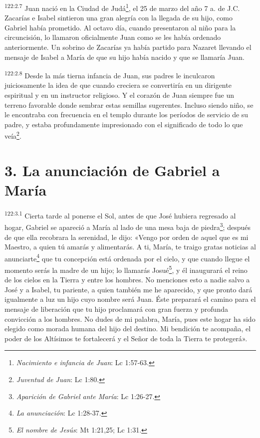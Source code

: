 \par 
\textsuperscript{122:2.7} Juan nació en la Ciudad de Judá\footnote{\textit{Nacimiento e infancia de Juan}: Lc 1:57-63.}, el 25 de marzo del año
7 a. de J.C. Zacarías e Isabel sintieron una gran alegría con la llegada de su hijo, como Gabriel había prometido. Al octavo día, cuando presentaron al niño para la circuncisión, lo llamaron oficialmente Juan como se les había ordenado anteriormente. Un sobrino de Zacarías ya había partido para Nazaret llevando el mensaje de Isabel a María de que su hijo había nacido y que se llamaría Juan.

\par 
\textsuperscript{122:2.8} Desde la más tierna infancia de Juan, sus padres le inculcaron juiciosamente la idea de que cuando creciera se convertiría en un dirigente espiritual y en un instructor religioso. Y el corazón de Juan siempre fue un terreno favorable donde sembrar estas semillas sugerentes. Incluso siendo niño, se le encontraba con frecuencia en el templo durante los períodos de servicio de su padre, y estaba profundamente impresionado con el significado de todo lo que veía\footnote{\textit{Juventud de Juan}: Lc 1:80.}.

\section*{3. La anunciación de Gabriel a María}
\par 
\textsuperscript{122:3.1} Cierta tarde al ponerse el Sol, antes de que José hubiera regresado al hogar, Gabriel se apareció a María al lado de una mesa baja de piedra\footnote{\textit{Aparición de Gabriel ante María}: Lc 1:26-27.}; después de que ella recobrara la serenidad, le dijo: «Vengo por orden de aquel que es mi Maestro, a quien tú amarás y alimentarás. A ti, María, te traigo gratas noticias al anunciarte\footnote{\textit{La anunciación}: Lc 1:28-37.} que tu concepción está ordenada por el cielo, y que cuando llegue el momento serás la madre de un hijo; lo llamarás Josué\footnote{\textit{El nombre de Jesús}: Mt 1:21,25; Lc 1:31.}, y él inaugurará el reino de los cielos en la Tierra y entre los hombres. No menciones esto a nadie salvo a José y a Isabel, tu pariente, a quien también me he aparecido, y que pronto dará igualmente a luz un hijo cuyo nombre será Juan. Éste preparará el camino para el mensaje de liberación que tu hijo proclamará con gran fuerza y profunda convicción a los hombres. No dudes de mi palabra, María, pues este hogar ha sido elegido como morada humana del hijo del destino. Mi bendición te acompaña, el poder de los Altísimos te fortalecerá y el Señor de toda la Tierra te protegerá».

